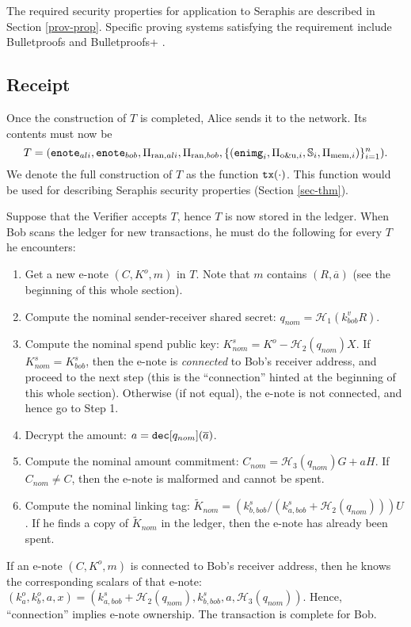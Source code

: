 \documentclass{article}
\begin{document}
The required security properties for application to Seraphis are described in Section \ref{prov-prop}. Specific proving systems satisfying the requirement include Bulletproofs \cite{bp} and Bulletproofs+ \cite{bp-plus}.

\subsection{Receipt}
Once the construction of $T$ is completed, Alice sends it to the network. Its contents must now be
$$T=({\tt enote}_{ali}, {\tt enote}_{bob}, \Pi_{\text{ran}, ali}, \Pi_{\text{ran}, bob}, \{({\tt enimg}_i, \Pi_{\text{o\&u}, i}, \mathbb{S}_i, \Pi_{\text{mem}, i})\}_{i=1}^n).$$
We denote the full construction of $T$ as the function ${\tt tx}(\cdot)$. This function would be used for describing Seraphis security properties (Section \ref{sec-thm}).

Suppose that the Verifier accepts $T$, hence $T$ is now stored in the ledger. When Bob scans the ledger for new transactions, he must do the following for every $T$ he encounters:
\begin{enumerate}
    \item Get a new e-note $(C, K^o, m)$ in $T$. Note that $m$ contains $(R, \overline{a})$ (see the beginning of this whole section).
    \item Compute the nominal sender-receiver shared secret: $q_{nom} = \mathcal{H}_1(k_{bob}^v R)$.
    \item Compute the nominal spend public key: $K_{nom}^s = K^o - \mathcal{H}_2(q_{nom})X$. If $K_{nom}^s = K_{bob}^s$, then the e-note is \textit{connected} to Bob's receiver address, and proceed to the next step (this is the ``connection'' hinted at the beginning of this whole section).  Otherwise (if not equal), the e-note is not connected, and hence go to Step 1.
    \item Decrypt the amount: $a = {\tt dec}[q_{nom}](\overline a)$.
    \item Compute the nominal amount commitment: $C_{nom} = \mathcal{H}_3(q_{nom})G + a H$. If $C_{nom} \ne C$, then the e-note is malformed and cannot be spent.
    \item Compute the nominal linking tag: $\tilde{K}_{nom} = (k_{b, bob}^s/(k_{a, bob}^s + \mathcal{H}_2(q_{nom})))U$. If he finds a copy of $\tilde{K}_{nom}$ in the ledger, then the e-note has already been spent.
\end{enumerate}
If an e-note $(C, K^o, m)$ is connected to Bob's receiver address, then he knows the corresponding scalars of that e-note: $(k_a^o, k_b^o, a, x) = (k_{a, bob}^s + \mathcal{H}_2(q_{nom}), k_{b, bob}^s, a, \mathcal{H}_3(q_{nom}))$. Hence, ``connection'' implies e-note ownership. The transaction is complete for Bob.
\end{document}
